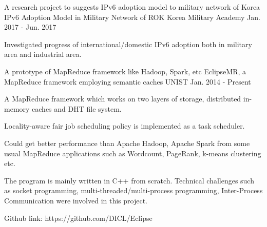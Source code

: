 \begin{cventries}

\cventry
{A research project to suggests IPv6 adoption model to military network of Korea} %
{IPv6 Adoption Model in Military Network of ROK} %
{Korea Military Academy} %
{Jan. 2017 - Jun. 2017} %
{ %
\begin{cvitems}
\item {Investigated progress of international/domestic IPv6 adoption both in military
area and industrial area.}
\end{cvitems}
}


\cventry
{A prototype of MapReduce framework like Hadoop, Spark, etc} %
{EclipseMR, a MapReduce framework employing semantic caches} %
{UNIST} %
{Jan. 2014 - Present} %
{ %
\begin{cvitems}
\item {A MapReduce framework which works on two layers of storage, distributed in-memory
caches and DHT file system.}
\item {Locality-aware fair job scheduling policy is implemented as a task scheduler.}
\item {Could get better performance than Apache Hadoop, Apache Spark from some usual
MapReduce applications such as Wordcount, PageRank, k-means clustering etc.}
\item {The program is mainly written in C++ from scratch. Technical challenges such as socket
programming, multi-threaded/multi-process programming, Inter-Process Communication were involved
in this project.}
\item {Github link: https://github.com/DICL/Eclipse}
\end{cvitems}
}



\end{cventries}
